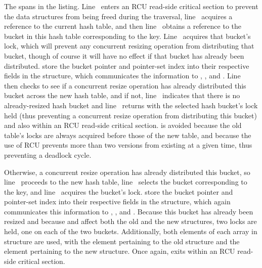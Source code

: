 \begin{fcvref}
The  spans
 in the listing.
Line~ enters an RCU read-side critical section to prevent
the data structures from being freed during the traversal,
line~ acquires a reference to the current hash table, and then
line~ obtains a reference to the bucket in this hash table
corresponding to the key.
Line~ acquires that bucket's lock, which will prevent any concurrent
resizing operation from distributing that bucket, though of course it
will have no effect if that bucket has already been distributed.
 store the bucket pointer and
pointer-set index into their respective fields in the
 structure, which communicates the information to
, , and .
Line~ then checks to see if a concurrent resize
operation has already distributed this bucket across the new hash table,
and if not, line~ indicates that there is no
already-resized hash bucket and
line~ returns with the selected hash bucket's
lock held (thus preventing a concurrent resize operation from distributing
this bucket) and also within an RCU read-side critical section.
 is avoided because the old table's locks are always acquired
before those of the new table, and because the use of RCU prevents more
than two versions from existing at a given time, thus preventing a
deadlock cycle.

Otherwise, a concurrent resize operation has already distributed this
bucket, so line~ proceeds to the new hash table,
line~ selects the bucket corresponding to the key,
and line~ acquires the bucket's lock.
 store the bucket pointer and
pointer-set index into their respective fields in the
 structure, which again communicates this information to
, , and .
Because this bucket has already been resized and because
 and  affect both the old and the
new  structures, two locks are held, one on each of the
two buckets.
Additionally, both elements of each array in  structure
are used, with the \co{[0]} element pertaining to the old 
structure and the \co{[1]} element pertaining to the new structure.
Once again,  exits within an RCU read-side critical
section.
\end{fcvref}

